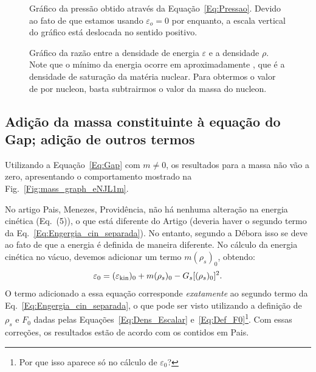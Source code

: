 \begin{figure}
	
	\caption{Gráfico da pressão obtido através da Equação~\eqref{Eq:Pressao}. Devido ao fato de que estamos usando $\varepsilon_o = 0$ por enquanto, a escala vertical do gráfico está deslocada no sentido positivo. \protect}
	\label{Fig:pressure_graph}
\end{figure}

\begin{figure}
	
	\caption{Gráfico da razão entre a densidade de energia $\varepsilon$ e a densidade $\rho$. Note que o mínimo da energia ocorre em aproximadamente , que é a densidade de saturação da matéria nuclear. Para obtermos o valor de  por nucleon, basta subtrairmos o valor da massa do nucleon. \protect}
	\label{Fig:energy_by_nucleon_graph}
\end{figure}

\FloatBarrier
\subsection{Adição da massa constituinte à equação do Gap; adição de outros termos}

Utilizando a Equação~\ref{Eq:Gap} com $m \neq 0$, os resultados para a massa não vão a zero, apresentando o comportamento mostrado na Fig.~\ref{Fig:mass_graph_eNJL1m}.

No artigo Pais, Menezes, Providência, não há nenhuma alteração na energia cinética (Eq.~(5)), o que está diferente do Artigo\cite{PRC_68_035804_2003} (deveria haver o segundo termo da Eq.~\eqref{Eq:Engergia_cin_separada}). No entanto, segundo a Débora isso se deve ao fato de que a energia é definida de maneira diferente. No cálculo da energia cinética no vácuo, devemos adicionar um termo $m (\rho_s)_0$, obtendo:
\begin{equation}
	\varepsilon_0 = (\varepsilon_{\rm{kin}})_0 + m (\rho_s)_0 - G_s [(\rho_s)_0]^2.
\end{equation}
%
O termo adicionado a essa equação corresponde \emph{exatamente} ao segundo termo da Eq.~\eqref{Eq:Engergia_cin_separada}, o que pode ser visto utilizando a definição de $\rho_s$ e $F_0$ dadas pelas Equações~\eqref{Eq:Dens_Escalar} e~\eqref{Eq:Def_F0}\footnote{Por que isso aparece só no cálculo de $\varepsilon_0$?}. Com essas correções, os resultados estão de acordo com os contidos em Pais\cite{Pais}.

